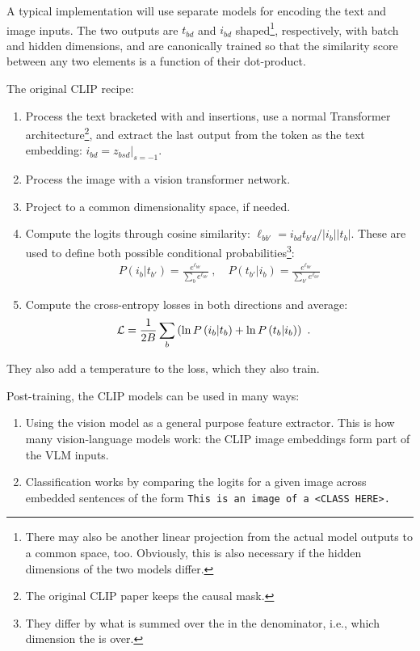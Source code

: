 A typical implementation will use separate models for encoding the text and image inputs. The two
outputs are $ t _{ bd } $ and $ i _{ bd } $ shaped\footnote{There may also be another linear
projection from the actual model outputs to a common space, too. Obviously, this is also necessary
if the hidden dimensions of the two models differ.}, respectively, with batch and hidden dimensions,
and are canonically trained so that the similarity score between any two elements is a function of
their dot-product.

The original CLIP recipe:
\begin{enumerate}
    \item Process the text bracketed with \pyinline{[SOS]} and \pyinline{[EOS]} insertions, use a
        normal Transformer architecture\footnote{The original CLIP paper keeps the causal mask.},
        and extract the last output from the \pyinline{[EOS]} token as the text embedding: $ i _{ bd
        }= z _{ bsd }\big|_{ s=-1 } $.
    \item Process the image with a vision transformer network.
    \item Project to a common dimensionality space, if needed.
    \item Compute the logits through cosine similarity: $ \ell _{ b b' } = i _{ bd }t _{ b'd }/ |i _{ b }||t _{ b }| $. These are used to
        define both possible conditional probabilities\footnote{They differ by what is summed over
        the in the denominator, i.e., which dimension the  is over.}:
        \begin{align}
         P(i_b|t _{ b' }) =  \frac{ e ^{ \ell _{b b'} } }{ \sum _{ b  } e ^{ \ell _{b b'} } }  \ ,
         \quad P(t _{ b' }| i _{ b }) =  \frac{ e ^{ \ell _{b b'} } }{ \sum _{ b' }  e ^{ \ell _{b b'} } }
        \end{align}
    \item Compute the cross-entropy losses in both directions and average:
        \begin{align}
           \mathcal{L}  &= \frac{ 1 }{ 2B }\sum _{ b } \left (\ln P \left ( i_b|t_b \right ) + \ln P \left ( t_b|i_b \right )\right ) \label{eq_clip_loss} \ .
        \end{align}
\end{enumerate}
They also add a temperature to the loss, which they also train.

Post-training, the CLIP models can be used in many ways:
\begin{enumerate}
    \item Using the vision model as a general purpose feature extractor. This is how many
        vision-language models work: the CLIP image embeddings form part of the VLM inputs.
    \item Classification works by comparing the logits for a given image across embedded sentences
        of the form \texttt{This is an image of a <CLASS HERE>.}
\end{enumerate}


